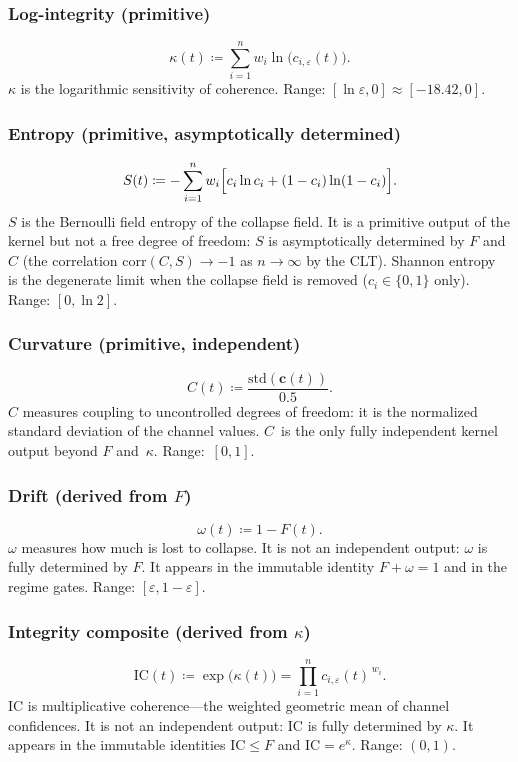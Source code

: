 \documentclass[
  aps,
  prd,
  twocolumn,
  superscriptaddress,
  nofootinbib,
  floatfix
]{revtex4-2}
\newcommand{\eps}{\varepsilon}
\newcommand{\beq}{\begin{equation}}
\newcommand{\eeq}{\end{equation}}
\newcommand{\tvec}{\mathbf{c}}
\newcommand{\IC}{\mathrm{IC}}
\begin{document}
\subsubsection{Log-integrity (primitive)}
\beq
  \kappa(t) \coloneqq \sum_{i=1}^n w_i \ln\!\bigl(c_{i,\eps}(t)\bigr).
  \label{eq:kappa}
\eeq
$\kappa$ is the logarithmic sensitivity of coherence.
Range: $[\ln\eps, 0] \approx [-18.42, 0]$.

\subsubsection{Entropy (primitive, asymptotically determined)}
\beq
  S(t) \coloneqq -\sum_{i=1}^n w_i\Bigl[
    c_i \ln c_i + (1-c_i) \ln(1-c_i)
  \Bigr].
  \label{eq:S}
\eeq
$S$ is the Bernoulli field entropy of the collapse field.  It is
a primitive output of the kernel but not a free degree of freedom:
$S$ is asymptotically determined by $F$ and $C$ (the correlation
$\mathrm{corr}(C,S) \to -1$ as $n \to \infty$ by the CLT).
Shannon entropy~\cite{shannon1948} is the degenerate limit when
the collapse field is removed ($c_i \in \{0,1\}$ only).  Range:
$[0, \ln 2]$.

\subsubsection{Curvature (primitive, independent)}
\beq
  C(t) \coloneqq \frac{\mathrm{std}(\tvec(t))}{0.5}.
  \label{eq:C}
\eeq
$C$ measures coupling to uncontrolled degrees of freedom: it is
the normalized standard deviation of the channel values.
$C$~is the only fully independent kernel output beyond $F$
and~$\kappa$.  Range:~$[0, 1]$.

\subsubsection{Drift (derived from \texorpdfstring{$F$}{F})}
\beq
  \omega(t) \coloneqq 1 - F(t).
  \label{eq:omega}
\eeq
$\omega$ measures how much is lost to collapse.  It is not an
independent output: $\omega$ is fully determined by $F$.  It
appears in the immutable identity $F + \omega = 1$ and in the
regime gates.  Range: $[\eps, 1-\eps]$.

\subsubsection{Integrity composite (derived from \texorpdfstring{$\kappa$}{kappa})}
\beq
  \IC(t) \coloneqq \exp\!\bigl(\kappa(t)\bigr)
  = \prod_{i=1}^n c_{i,\eps}(t)^{\,w_i}.
  \label{eq:IC}
\eeq
$\IC$ is multiplicative coherence---the weighted geometric mean
of channel confidences.  It is not an independent output: $\IC$
is fully determined by $\kappa$.  It appears in the immutable
identities $\IC \leq F$ and $\IC = e^\kappa$.
Range: $(0, 1)$.
\end{document}
